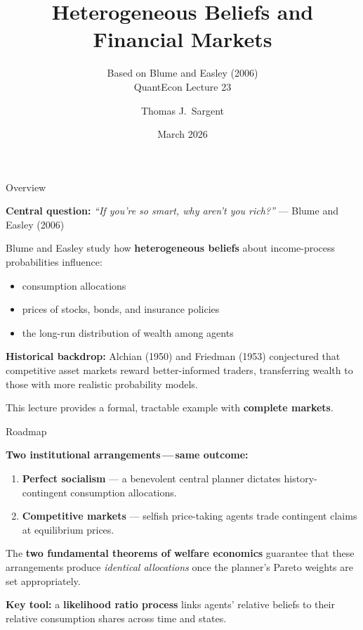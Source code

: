 \documentclass[aspectratio=169,12pt]{beamer}
\title[Heterogeneous Beliefs \& Markets]{Heterogeneous Beliefs and Financial Markets}
\subtitle{Based on Blume and Easley (2006) \\ QuantEcon Lecture 23}
\author{Thomas J.\ Sargent}
\institute{New York University}
\date{March 2026}
\begin{document}
\begin{frame}
  \titlepage
\end{frame}

\begin{frame}{Overview}

\textbf{Central question:} \emph{``If you're so smart, why aren't you rich?''} --- Blume and Easley (2006)

\bigskip
Blume and Easley study how \textbf{heterogeneous beliefs} about income-process probabilities influence:
\begin{itemize}
  \item consumption allocations
  \item prices of stocks, bonds, and insurance policies
  \item the long-run distribution of wealth among agents
\end{itemize}

\bigskip
\textbf{Historical backdrop:} Alchian (1950) and Friedman (1953) conjectured that competitive asset markets reward better-informed traders, transferring wealth to those with more realistic probability models.

\bigskip
This lecture provides a formal, tractable example with \textbf{complete markets}.

\end{frame}

\begin{frame}{Roadmap}

\textbf{Two institutional arrangements\,---\,same outcome:}

\begin{enumerate}
  \item \textbf{Perfect socialism} --- a benevolent central planner dictates
        history-contingent consumption allocations.
  \item \textbf{Competitive markets} --- selfish price-taking agents trade
        contingent claims at equilibrium prices.
\end{enumerate}

\bigskip
The \textbf{two fundamental theorems of welfare economics} guarantee that these
arrangements produce \emph{identical allocations} once the planner's Pareto
weights are set appropriately.

\bigskip
\textbf{Key tool:} a \textbf{likelihood ratio process} links agents' relative
beliefs to their relative consumption shares across time and states.

\end{frame}
\end{document}
